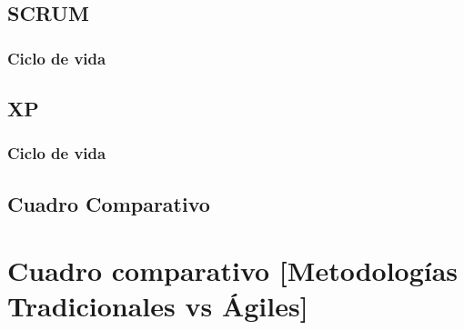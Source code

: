 \subsection{SCRUM}
\subsubsection{Ciclo de vida}
\subsection{XP}
\subsubsection{Ciclo de vida}
\subsection{}
\subsection{Cuadro Comparativo}

\section{Cuadro comparativo [Metodologías Tradicionales vs Ágiles]} 
